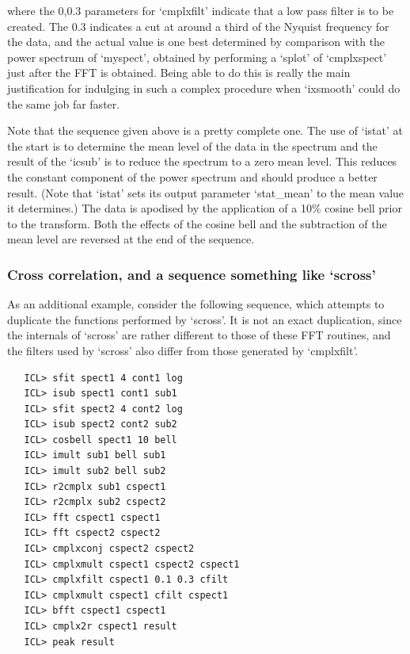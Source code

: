    where the 0,0.3 parameters for `cmplxfilt' indicate that a low pass
   filter is to be created.  The 0.3 indicates a cut at around a third
   of the Nyquist frequency for the data, and the actual value is one
   best determined by comparison with the power spectrum of `myspect',
   obtained by performing a `splot' of `cmplxspect' just after the FFT
   is obtained.  Being able to do this is really the main justification
   for indulging in such a complex procedure when `ixsmooth' could do
   the same job far faster.

   Note that the sequence given above is a pretty complete one.  The use
   of `istat' at the start is to determine the mean level of the data in
   the spectrum and the result of the `icsub' is to reduce the spectrum
   to a zero mean level.  This reduces the constant component of the
   power spectrum and should produce a better result.  (Note that
   `istat' sets its output parameter `stat\_mean' to the mean value it
   determines.)  The data is apodised by the application of a 10\% cosine
   bell prior to the transform.  Both the effects of the cosine bell and
   the subtraction of the mean level are reversed at the end of the
   sequence.


\subsubsection{\label{techno6cross}Cross correlation, and a sequence something like `scross'}

   As an additional example, consider the following sequence, which
   attempts to duplicate the functions performed by `scross'. It is not
   an exact duplication, since the internals of `scross' are rather
   different to those of these FFT routines, and the filters used by
   `scross' also differ from those generated by `cmplxfilt'.

\begin{verbatim}
   ICL> sfit spect1 4 cont1 log
   ICL> isub spect1 cont1 sub1
   ICL> sfit spect2 4 cont2 log
   ICL> isub spect2 cont2 sub2
   ICL> cosbell spect1 10 bell
   ICL> imult sub1 bell sub1
   ICL> imult sub2 bell sub2
   ICL> r2cmplx sub1 cspect1
   ICL> r2cmplx sub2 cspect2
   ICL> fft cspect1 cspect1
   ICL> fft cspect2 cspect2
   ICL> cmplxconj cspect2 cspect2
   ICL> cmplxmult cspect1 cspect2 cspect1
   ICL> cmplxfilt cspect1 0.1 0.3 cfilt
   ICL> cmplxmult cspect1 cfilt cspect1
   ICL> bfft cspect1 cspect1
   ICL> cmplx2r cspect1 result
   ICL> peak result
\end{verbatim}

